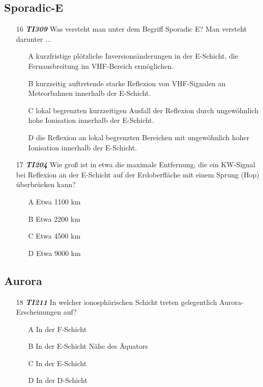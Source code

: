 \subsection*{Sporadic-E}

\begin{enumerate} 
\itemsep1pt\parskip0pt
\item[16] \emph{\textbf{TI309}}   Was versteht man unter dem Begriff Sporadic E? Man versteht darunter ...
	\begin{enumerate}
	\itemsep1pt\parskip0pt
		\item[A] kurzfristige plötzliche Inversionsänderungen in der E-Schicht, die Fernausbreitung im VHF-Bereich ermöglichen.
		\item[B] kurzzeitig auftretende starke Reflexion von VHF-Signalen an Meteorbahnen innerhalb der E-Schicht.
		\item[C] lokal begrenzten kurzzeitigen Ausfall der Reflexion durch ungewöhnlich hohe Ionisation innerhalb der E-Schicht.
		\item[D] die Reflexion an lokal begrenzten Bereichen mit ungewöhnlich hoher Ionisation innerhalb der E-Schicht.
	\end{enumerate}
\end{enumerate}

\begin{enumerate} 
\itemsep1pt\parskip0pt
\item[17] \emph{\textbf{TI204}}  Wie groß ist in etwa die maximale Entfernung, die ein KW-Signal bei Reflexion an der E-Schicht auf der Erdoberfläche mit einem Sprung (Hop) überbrücken kann?
	\begin{enumerate}
	\itemsep1pt\parskip0pt
		\item[A] Etwa 1100 km
		\item[B] Etwa 2200 km
		\item[C] Etwa 4500 km
		\item[D] Etwa 9000 km
	\end{enumerate}
\end{enumerate}

\subsection*{Aurora}

\begin{enumerate} 
\itemsep1pt\parskip0pt
\item[18] \emph{\textbf{TI211}}   In welcher ionosphärischen Schicht treten gelegentlich Aurora-Erscheinungen auf?
	\begin{enumerate}
	\itemsep1pt\parskip0pt
		\item[A] In der F-Schicht
		\item[B] In der E-Schicht Nähe des Äquators
		\item[C] In der E-Schicht
		\item[D] In der D-Schicht
	\end{enumerate}
\end{enumerate}


